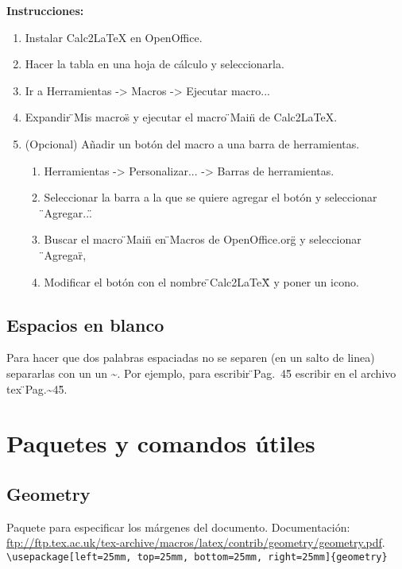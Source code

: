 \documentclass[12pt, a4paper,twoside]{article} %
\begin{document}
\noindent\textbf{Instrucciones:}

\begin{enumerate}
\item Instalar Calc2LaTeX en OpenOffice.
\item Hacer la tabla en una hoja de cálculo y seleccionarla.
\item Ir a Herramientas -> Macros -> Ejecutar macro...
\item Expandir \"{}Mis macros\"{} y ejecutar el macro \"{}Main\"{} de Calc2LaTeX.
\item (Opcional) Añadir un botón del macro a una barra de herramientas.
\begin{enumerate}
    \item Herramientas -> Personalizar... -> Barras de herramientas.
    \item Seleccionar la barra a la que se quiere agregar el botón y seleccionar \"{}Agregar...\"{}
    \item Buscar el macro \"{}Main\"{} en \"{}Macros de OpenOffice.org\"{} y seleccionar \"{}Agregar\"{},
    \item Modificar el botón con el nombre \"{}Calc2LaTeX\"{} y poner un icono.
\end{enumerate}
\end{enumerate}

\subsection{Espacios en blanco}

Para hacer que dos palabras espaciadas no se separen (en un salto de linea) separarlas con un un \textasciitilde. Por ejemplo, para escribir \"{}Pag.~45\"{} escribir en el archivo tex \"{}Pag.\textasciitilde 45\"{}.

\section{Paquetes y comandos útiles}

\subsection{Geometry}

Paquete para especificar los márgenes del documento. Documentación: \url{ftp://ftp.tex.ac.uk/tex-archive/macros/latex/contrib/geometry/geometry.pdf}.\\

\noindent\lstinline$\usepackage[left=25mm, top=25mm, bottom=25mm, right=25mm]{geometry}$
\end{document}
